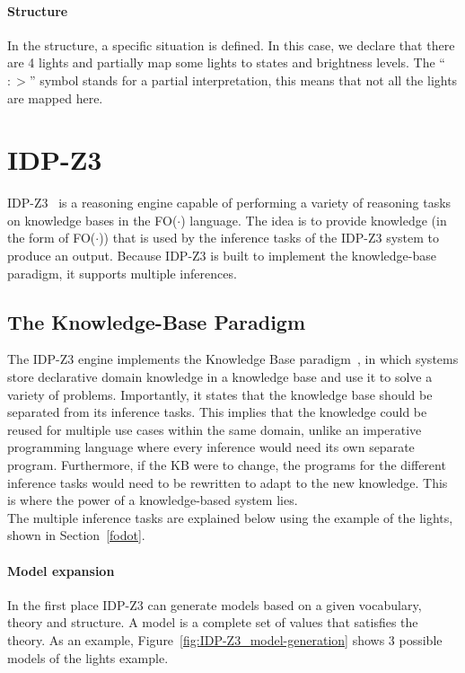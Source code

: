 \documentclass[11pt,a4paper]{report}
\newcommand{\fodot}{FO($\cdot$)\xspace}
\begin{document}
\paragraph{Structure}
In the structure, a specific situation is defined. In this case, we declare that there are 4 lights and partially map some lights to states and brightness levels. The ``$:>$'' symbol stands for a partial interpretation, this means that not all the lights are mapped here.



\section{IDP-Z3}
IDP-Z3~\cite{IDPZ3ReasoningEngine} is a reasoning engine capable of performing a variety of reasoning tasks on knowledge bases in the \fodot language. The idea is to provide knowledge (in the form of \fodot) that is used by the inference tasks of the IDP-Z3 system to produce an output. Because IDP-Z3 is built to implement the knowledge-base paradigm, it supports multiple inferences.

\subsection{The Knowledge-Base Paradigm}
The IDP-Z3 engine implements the Knowledge Base paradigm~\cite{IDPZ3KBParadigm}, in which systems store declarative domain knowledge in a knowledge base and use it to solve a variety of problems. Importantly, it states that the knowledge base should be separated from its inference tasks. This implies that the knowledge could be reused for multiple use cases within the same domain, unlike an imperative programming language where every inference would need its own separate program. Furthermore, if the KB were to change, the programs for the different inference tasks would need to be rewritten to adapt to the new knowledge. This is where the power of a knowledge-based system lies.\\
The multiple inference tasks are explained below using the example of the lights, shown in Section~\ref{fodot}.

\paragraph{Model expansion}
In the first place IDP-Z3 can generate models based on a given vocabulary, theory and structure. A model is a complete set of values that satisfies the theory. As an example, Figure~\ref{fig:IDP-Z3_model-generation} shows 3 possible models of the lights example. 
\end{document}

